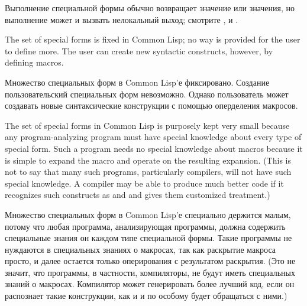 Выполнение специальной формы обычно возвращает значение или значения, но
выполнение может и вызвать нелокальный выход; смотрите ,
 и .

The set of special forms is fixed in Common Lisp; no way is provided
for the user to define more.  The user can create new syntactic
constructs, however, by defining macros.

Множество специальных форм в Common Lisp'е фиксировано. Создание
пользовательский специальных форм невозможно. Однако пользователь может создавать новые
синтаксические конструкции с помощью оперделения макросов.

The set of special forms in Common Lisp is purposely kept very small
because any program-analyzing program must have special knowledge
about every type of special form.  Such a program needs no special
knowledge about macros because it is simple to expand the macro
and operate on the resulting expansion.  (This is not to say that
many such programs, particularly compilers, will not have such
special knowledge.  A compiler may be able
to produce much better code if it recognizes such constructs
as  and  and gives them customized
treatment.)

Множество специальных форм в Common Lisp'е специально держится малым, потому что
любая программа, анализирующая программы, должна содержить специальные знания он
каждом типе специальной формы. Такие программы не нуждаются в специальных
знаниях о макросах, так как раскрытие макроса просто, и далее остается только
оперирования с результатом раскрытия. (Это не значит, что программы, в
частности, компиляторы, не будут иметь специальных знаний о макросах. Компилятор
может генерировать более лучший код, если он распознает такие конструкции, как
 и  и по особому будет обращаться с ними.)

